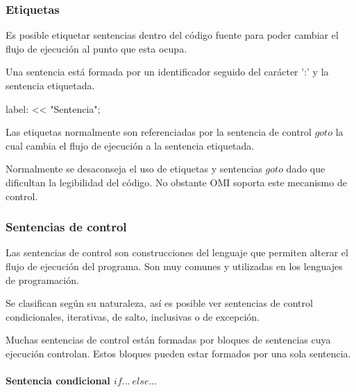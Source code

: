 \subsubsection{Etiquetas} \label{sec:label}
Es posible etiquetar sentencias dentro del código fuente para poder cambiar el flujo de ejecución al punto que esta ocupa.

Una sentencia está formada por un identificador seguido del carácter ':' y la sentencia etiquetada.

\begin{myverbatim}
   label: << "Sentencia";
\end{myverbatim}

Las etiquetas normalmente son referenciadas por la sentencia de control $goto$ la cual cambia el flujo de ejecución 
a la sentencia etiquetada. 

Normalmente se desaconseja el uso de etiquetas y sentencias $goto$ dado que dificultan la legibilidad del código. No obstante OMI 
soporta este mecanismo de control.




\subsubsection{Sentencias de control}

Las sentencias de control son construcciones del lenguaje que permiten alterar el flujo de ejecución del programa. Son muy comunes y
utilizadas en los lenguajes de programación.

Se clasifican según su naturaleza, así es posible ver sentencias de control condicionales, iterativas, de salto, inclusivas o de excepción.

Muchas sentencias de control están formadas por bloques de sentencias cuya ejecución controlan. Estos bloques pueden estar formados por una sola sentencia.



\paragraph{Sentencia condicional $if...\ else...$}\label{sec:stmt_if}


